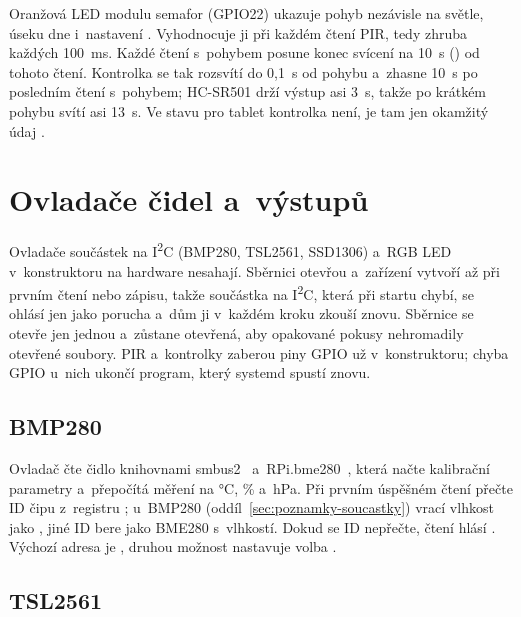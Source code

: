 Oranžová LED modulu semafor (GPIO22) ukazuje pohyb nezávisle na světle, úseku dne i~nastavení
. Vyhodnocuje ji  při každém čtení PIR, tedy
zhruba každých 100~ms. Každé čtení s~pohybem posune konec svícení na 10~s
() od tohoto čtení. Kontrolka se tak rozsvítí do 0,1~s od pohybu
a~zhasne 10~s po posledním čtení s~pohybem; HC-SR501 drží výstup asi 3~s, takže po krátkém
pohybu svítí asi 13~s. Ve stavu pro tablet kontrolka není, je tam jen okamžitý údaj .

\section{Ovladače čidel a~výstupů}
\label{sec:ovladace}

Ovladače součástek na I\textsuperscript{2}C (BMP280, TSL2561, SSD1306) a~RGB LED v~konstruktoru
na hardware nesahají. Sběrnici otevřou a~zařízení vytvoří až při prvním čtení nebo zápisu, takže
součástka na I\textsuperscript{2}C, která při startu chybí, se ohlásí jen jako porucha a~dům ji
v~každém kroku zkouší znovu. Sběrnice se otevře jen jednou a~zůstane otevřená, aby opakované pokusy nehromadily
otevřené soubory. PIR a~kontrolky zaberou piny GPIO už v~konstruktoru; chyba GPIO u~nich ukončí
program, který systemd spustí znovu.

\subsection{BMP280}

Ovladač  čte čidlo knihovnami smbus2~\cite{smbus2} a~RPi.bme280~\cite{rpibme280},
která načte kalibrační parametry a~přepočítá měření na °C, \% a~hPa. Při prvním úspěšném čtení
přečte ID čipu z~registru ; u~BMP280 (oddíl~\ref{sec:poznamky-soucastky}) vrací vlhkost
jako , jiné ID bere jako BME280 s~vlhkostí. Dokud se ID nepřečte, čtení hlásí
. Výchozí adresa je , druhou možnost  nastavuje volba
.

\subsection{TSL2561}

